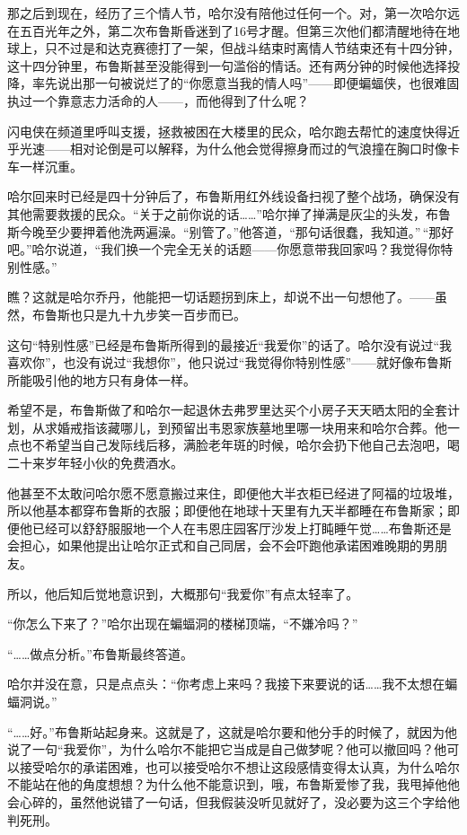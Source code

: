 \documentclass[../main.tex]{subfiles}
\begin{document}
那之后到现在，经历了三个情人节，哈尔没有陪他过任何一个。对，第一次哈尔远在五百光年之外，第二次布鲁斯昏迷到了16号才醒。但第三次他们都清醒地待在地球上，只不过是和达克赛德打了一架，但战斗结束时离情人节结束还有十四分钟，这十四分钟里，布鲁斯甚至没能得到一句滥俗的情话。还有两分钟的时候他选择投降，率先说出那一句被说烂了的“你愿意当我的情人吗”——即便蝙蝠侠，也很难固执过一个靠意志力活命的人——，而他得到了什么呢？

闪电侠在频道里呼叫支援，拯救被困在大楼里的民众，哈尔跑去帮忙的速度快得近乎光速——相对论倒是可以解释，为什么他会觉得擦身而过的气浪撞在胸口时像卡车一样沉重。

哈尔回来时已经是四十分钟后了，布鲁斯用红外线设备扫视了整个战场，确保没有其他需要救援的民众。“关于之前你说的话……”哈尔掸了掸满是灰尘的头发，布鲁斯今晚至少要押着他洗两遍澡。“别管了。”他答道，“那句话很蠢，我知道。”\,“那好吧。”哈尔说道，“我们换一个完全无关的话题——你愿意带我回家吗？我觉得你特别性感。”

瞧？这就是哈尔乔丹，他能把一切话题拐到床上，却说不出一句想他了。——虽然，布鲁斯也只是九十九步笑一百步而已。

这句“特别性感”已经是布鲁斯所得到的最接近“我爱你”的话了。哈尔没有说过“我喜欢你”，也没有说过“我想你”，他只说过“我觉得你特别性感”——就好像布鲁斯所能吸引他的地方只有身体一样。

希望不是，布鲁斯做了和哈尔一起退休去弗罗里达买个小房子天天晒太阳的全套计划，从求婚戒指该藏哪儿，到预留出韦恩家族墓地里哪一块用来和哈尔合葬。他一点也不希望当自己发际线后移，满脸老年斑的时候，哈尔会扔下他自己去泡吧，喝二十来岁年轻小伙的免费酒水。

他甚至不太敢问哈尔愿不愿意搬过来住，即便他大半衣柜已经进了阿福的垃圾堆，所以他基本都穿布鲁斯的衣服；即便他在地球十天里有九天半都睡在布鲁斯家；即便他已经可以舒舒服服地一个人在韦恩庄园客厅沙发上打盹睡午觉……布鲁斯还是会担心，如果他提出让哈尔正式和自己同居，会不会吓跑他承诺困难晚期的男朋友。

所以，他后知后觉地意识到，大概那句“我爱你”有点太轻率了。

“你怎么下来了？”哈尔出现在蝙蝠洞的楼梯顶端，“不嫌冷吗？”

“……做点分析。”布鲁斯最终答道。

哈尔并没在意，只是点点头：“你考虑上来吗？我接下来要说的话……我不太想在蝙蝠洞说。”

“……好。”布鲁斯站起身来。这就是了，这就是哈尔要和他分手的时候了，就因为他说了一句“我爱你”，为什么哈尔不能把它当成是自己做梦呢？他可以撤回吗？他可以接受哈尔的承诺困难，也可以接受哈尔不想让这段感情变得太认真，为什么哈尔不能站在他的角度想想？为什么他不能意识到，哦，布鲁斯爱惨了我，我甩掉他他会心碎的，虽然他说错了一句话，但我假装没听见就好了，没必要为这三个字给他判死刑。
\end{document}
